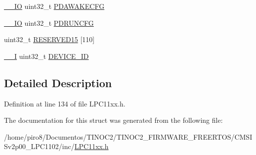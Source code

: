 \begin{DoxyCompactItemize}
\hyperlink{group___c_m_s_i_s__core__definitions_gaec43007d9998a0a0e01faede4133d6be}{\+\_\+\+\_\+\+IO} uint32\+\_\+t \hyperlink{group___l_p_c11xx___definitions_ga6b9a0f3442dd4f5a8a6bb8bc54236e62}{P\+D\+A\+W\+A\+K\+E\+C\+FG}
\item 
\hyperlink{group___c_m_s_i_s__core__definitions_gaec43007d9998a0a0e01faede4133d6be}{\+\_\+\+\_\+\+IO} uint32\+\_\+t \hyperlink{group___l_p_c11xx___definitions_gaabb6707dad69fdc2c8eb0b10524902dd}{P\+D\+R\+U\+N\+C\+FG}
\item 
uint32\+\_\+t \hyperlink{group___l_p_c11xx___definitions_gae7315f0a0ee0dc2a8e76d8bcd6f7d3cb}{R\+E\+S\+E\+R\+V\+E\+D15} \mbox{[}110\mbox{]}
\item 
\hyperlink{group___c_m_s_i_s__core__definitions_gaf63697ed9952cc71e1225efe205f6cd3}{\+\_\+\+\_\+I} uint32\+\_\+t \hyperlink{group___l_p_c11xx___definitions_ga4ab05124b010cfedcc6af2f10290cb27}{D\+E\+V\+I\+C\+E\+\_\+\+ID}
\end{DoxyCompactItemize}


\subsection{Detailed Description}


Definition at line 134 of file L\+P\+C11xx.\+h.



The documentation for this struct was generated from the following file\+:\begin{DoxyCompactItemize}
\item 
/home/piro8/\+Documentos/\+T\+I\+N\+O\+C2/\+T\+I\+N\+O\+C2\+\_\+\+F\+I\+R\+M\+W\+A\+R\+E\+\_\+\+F\+R\+E\+E\+R\+T\+O\+S/\+C\+M\+S\+I\+Sv2p00\+\_\+\+L\+P\+C1102/inc/\hyperlink{_l_p_c11xx_8h}{L\+P\+C11xx.\+h}\end{DoxyCompactItemize}
